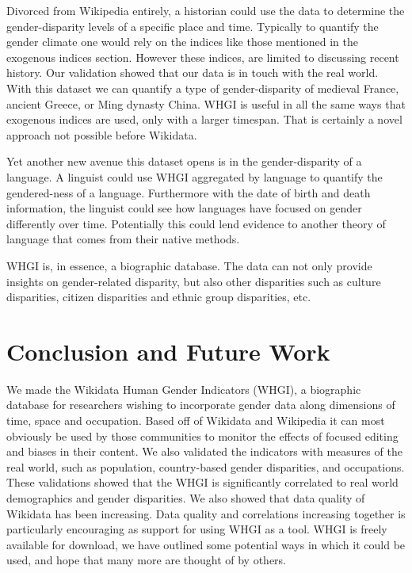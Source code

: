 \documentclass{sig-alternate-05-2015}
\begin{document}
Divorced from Wikipedia entirely, a historian could use the data to determine the gender-disparity levels of a specific place and time. Typically to quantify the gender climate one would rely on the indices like those mentioned in the exogenous indices section. However these indices, are limited to discussing recent history. Our validation showed that our data is in touch with the real world. With this dataset we can quantify a type of gender-disparity of medieval France, ancient Greece, or Ming dynasty China. WHGI is useful in all the same ways that exogenous indices are used, only with a larger timespan. That is certainly a novel approach not possible before Wikidata.

Yet another new avenue this dataset opens is in the gender-disparity of a language. A linguist could use WHGI aggregated by language to quantify the gendered-ness of a language. Furthermore with the date of birth and death information, the linguist could see how languages have focused on gender differently over time. Potentially this could lend evidence to another theory of language that comes from their native methods.

WHGI is, in essence, a biographic database. The data can not only provide insights on gender-related disparity, but also other disparities such as culture disparities, citizen disparities and ethnic group disparities, etc.

\section{Conclusion and Future Work}
We made the Wikidata Human Gender Indicators (WHGI), a biographic database for researchers wishing to incorporate gender data along dimensions of time, space and occupation. Based off of Wikidata and Wikipedia it can most obviously be used by those communities to monitor the effects of focused editing and biases in their content. We also validated the indicators with measures of the real world, such as population, country-based gender disparities, and occupations. These validations showed that the WHGI is significantly correlated to real world demographics and gender disparities. We also showed that data quality of Wikidata has been increasing. Data quality and correlations increasing together is particularly encouraging as support for using WHGI as a tool. WHGI is freely available for download, we have outlined some potential ways in which it could be used, and hope that many more are thought of by others.
\end{document}
